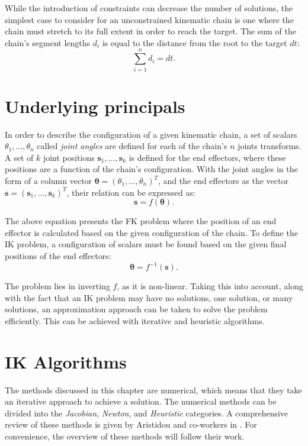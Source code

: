 While the introduction of constraints can decrease the number of solutions, the
simplest case to consider for an unconstrained kinematic chain is one where the
chain must stretch to its full extent in order to reach the target. The sum of
the chain's segment lengths \(d_i\) is equal to the distance from the root to
the target \(dt\):
\begin{equation}
    \sum_{i=1}^{n}d_i = dt.
\end{equation}

\section{Underlying principals}
In order to describe the configuration of a given kinematic chain, a set of
scalars \(\theta_1, \dots, \theta_n\) called \textit{joint angles} are defined
for each of the chain's \(n\) joints transforms. A set of \(k\) joint
positions \(\mathbf{s}_1, \dots, \mathbf{s}_k\) is defined for the end
effectors, where these positions are a function of the chain's configuration.
With the joint angles in the form of a column vector \(\bm{\theta} = (\theta_1,
\dots, \theta_n)^T\), and the end effectors as the vector \(\mathbf{s}
= (\mathbf{s}_1, \dots, \mathbf{s}_k)^T\), their relation can be expressed as:
\begin{equation} 
    \mathbf{s} = f(\bm{\theta}).
\end{equation}

The above equation \cite{Aristidou:2018:IK_survey} presents the FK problem where
the position of an end effector is calculated based on the given configuration
of the chain. To define the IK problem, a configuration of scalars must be found
based on the given final positions of the end effectors:
\begin{equation}
    \bm{\theta} = f^{-1}(\mathbf{s}).
\end{equation}

The problem lies in inverting \(f\), as it is non-linear. Taking this into
account, along with the fact that an IK problem may have no solutions, one
solution, or many solutions, an approximation approach can be taken to solve
the problem efficiently. This can be achieved with iterative and heuristic
algorithms.

\section{IK Algorithms}
The methods discussed in this chapter are numerical, which means that
they take an iterative approach to achieve a solution. The numerical methods
can be divided into the \textit{Jacobian}, \textit{Newton}, and
\textit{Heuristic} categories. A comprehensive review of these methods is given
by Aristidou and co-workers in \cite{Aristidou:2018:IK_survey}. For convenience,
the overview of these methods will follow their work.

